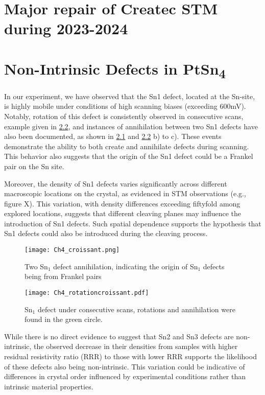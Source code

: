 \chapter{Major repair of Createc STM during 2023-2024}\label{appen:fix}

\chapter{Non-Intrinsic Defects in PtSn\textsubscript{4}} \label{appen:non-intrinsic}


\par In our experiment, we have observed that the Sn1 defect, located at the Sn-site, is highly mobile under conditions of high scanning biases (exceeding 600mV). Notably, rotation of this defect is consistently observed in consecutive scans, example given in \ref{fig:Ch4_rotationcroissant}, and instances of annihilation between two Sn1 defects have also been documented, as shown in \ref{fig:Ch4_croissantannihilation} and \ref{fig:Ch4_rotationcroissant} b) to c). These events demonstrate the ability to both create and annihilate defects during scanning. This behavior also suggests that the origin of the Sn1 defect could be a Frankel pair on the Sn site. %
\par Moreover, the density of Sn1 defects varies significantly across different macroscopic locations on the crystal, as evidenced in STM observations (e.g., figure X). This variation, with density differences exceeding fiftyfold among explored locations, suggests that different cleaving planes may influence the introduction of Sn1 defects. Such spatial dependence supports the hypothesis that Sn1 defects could also be introduced during the cleaving process. 
\begin{figure}
	\centering
	\texttt{[image: Ch4\_croissant.png]}
	\caption{Two Sn$_1$ defect annihilation, indicating the origin of Sn$_1$ defects being from Frankel pairs}
	\label{fig:Ch4_croissantannihilation}
\end{figure}

\begin{figure}
	\centering
	\texttt{[image: Ch4\_rotationcroissant.pdf]}
	\caption{Sn$_1$ defect under consecutive scans, rotations and annihilation were found in the green circle.}
	\label{fig:Ch4_rotationcroissant}
\end{figure}
\par While there is no direct evidence to suggest that Sn2 and Sn3 defects are non-intrinsic, the observed decrease in their densities from samples with higher residual resistivity ratio (RRR) to those with lower RRR supports the likelihood of these defects also being non-intrinsic. This variation could be indicative of differences in crystal order influenced by experimental conditions rather than intrinsic material properties.

